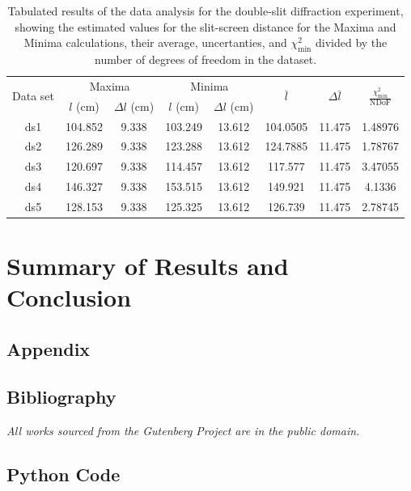 \documentclass[a4paper]{article}
\begin{document}
\begin{table}[]
  \centering
  \begin{tabular}{|c|cc|cc|ccc|}
  \hline
  \multirow{2}{*}{Data set} & \multicolumn{2}{c|}{Maxima} & \multicolumn{2}{c|}{Minima} & \multirow{2}{*}{$\bar l$} & \multirow{2}{*}{$\Delta\bar l$} & \multirow{2}{*}{$\frac{\chi^2_\text{min}}{\text{NDoF}}$} \\
                       & $l$ (cm)  & $\Delta l$ (cm)  & $l$ (cm)     & $\Delta l$ (cm) &                     &                      &                      \\\hline\hline
  ds1                    & 104.852      & 9.338       & 103.249      & 13.612      & 104.0505            & 11.475               & 1.48976              \\
  ds2                    & 126.289      & 9.338       & 123.288      & 13.612      & 124.7885            & 11.475               & 1.78767              \\
  ds3                    & 120.697      & 9.338       & 114.457      & 13.612      & 117.577             & 11.475               & 3.47055              \\
  ds4                    & 146.327      & 9.338       & 153.515      & 13.612      & 149.921             & 11.475               & 4.1336               \\
  ds5                    & 128.153      & 9.338       & 125.325      & 13.612      & 126.739             & 11.475               & 2.78745             \\\hline
  \end{tabular}
  \captionsetup{justification=centering}
  \caption{Tabulated results of the data analysis for the double-slit diffraction experiment, showing the estimated values for the slit-screen distance for the Maxima and Minima calculations, their average, uncertanties, and $\chi^2_\text{min}$ divided by the number of degrees of freedom in the dataset.}
  \label{tab:ds_results}
  \end{table}

\newpage
\section{Summary of Results and Conclusion}



\newpage
\begin{appendix}
\section{Appendix}
\subsection{Bibliography}
\emph{All works sourced from the Gutenberg Project are in the public domain.}


\subsection{Python Code}\label{sec:python}

\end{appendix}
\end{document}
